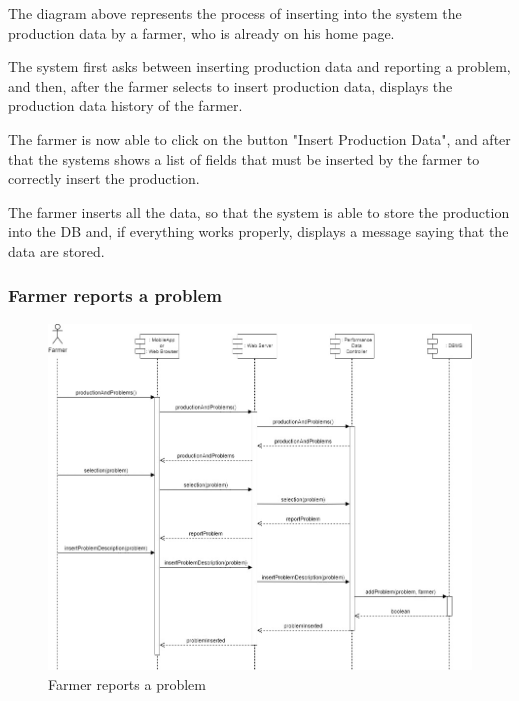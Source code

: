 \documentclass{article}
\begin{document}
        The diagram above represents the process of inserting into the system the production data by a farmer, who is already on his home page. \par
        The system first asks between inserting production data and reporting a problem, and then, after the farmer selects to insert production data, displays the production data history of the farmer. \par
        The farmer is now able to click on the button "Insert Production Data", and after that the systems shows a list of fields that must be inserted by the farmer to correctly insert the production. \par
        The farmer inserts all the data, so that the system is able to store the production into the DB and, if everything works properly, displays a message saying that the data are stored. \par
        
    
    \newpage
    
    
    \subsubsection{Farmer reports a problem}
        \begin{figure} [h]
            \centering
            \includegraphics[width=1\textwidth]{images/ArchitecturalDesign/RuntimeView/5. FarmerReportAProblem.jpg}
            \caption{\label{fig:farmerReportProblem}Farmer reports a problem}
        \end{figure}
        
\end{document}
